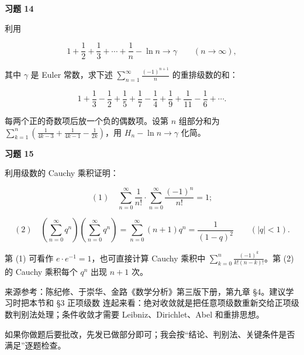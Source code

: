 \begin{exercisebox}
\textbf{习题 14 }

利用

\[
      1+\frac12+\frac13+\cdots+\frac1n-\ln n\to \gamma\qquad(n\to\infty),
      \]

其中 \(\gamma\) 是 Euler 常数，求下述 \(\sum_{n=1}^{\infty}\frac{(-1)^{n+1}}{n}\) 的重排级数的和：

\[
      1+\frac13-\frac12+\frac15+\frac17-\frac14+\frac19+\frac1{11}-\frac16+\cdots.
      \]

\begin{hintbox}
每两个正的奇数项后放一个负的偶数项。设第 \(n\) 组部分和为 \(\sum_{k=1}^n\left(\frac1{4k-3}+\frac1{4k-1}-\frac1{2k}\right)\)，用 \(H_n-\ln n\to\gamma\) 化简。
\end{hintbox}
\end{exercisebox}

\begin{exercisebox}
\textbf{习题 15 }

利用级数的 Cauchy 乘积证明：

\[
      (1)\quad
      \sum_{n=0}^{\infty}\frac1{n!}\cdot
      \sum_{n=0}^{\infty}\frac{(-1)^n}{n!}=1;
      \]

\[
      (2)\quad
      \left(\sum_{n=0}^{\infty}q^n\right)
      \left(\sum_{n=0}^{\infty}q^n\right)
      =
      \sum_{n=0}^{\infty}(n+1)q^n
      =
      \frac1{(1-q)^2}\qquad(|q|<1).
      \]

\begin{hintbox}
第 (1) 可看作 \(e\cdot e^{-1}=1\)，也可直接计算 Cauchy 乘积中 \(\sum_{k=0}^n\frac{(-1)^k}{k!(n-k)!}\)。第 (2) 的 Cauchy 乘积每个 \(q^n\) 出现 \(n+1\) 次。
\end{hintbox}
\end{exercisebox}

来源参考：陈纪修、于崇华、金路《数学分析》第三版下册，第九章 §4。建议学习时把本节和 §3 正项级数 连起来看：绝对收敛就是把任意项级数重新交给正项级数判别法处理；条件收敛才需要 Leibniz、Dirichlet、Abel 和重排思想。

如果你做题后要批改，先发已做部分即可；我会按“结论、判别法、关键条件是否满足”逐题检查。
